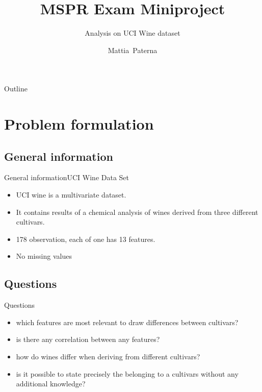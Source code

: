 \documentclass{beamer}
\title{MSPR Exam Miniproject}
\subtitle{Analysis on UCI Wine dataset}
\author{Mattia~Paterna}
\institute[Aalborg University, Copenhagen] %
{
  \inst{}%
  Sound and Music Computing\\
  Aalborg University, Copenhagen
}
\date{}
\begin{document}
\begin{frame}
  \titlepage
\end{frame}

\begin{frame}{Outline}
  \tableofcontents
\end{frame}

\section{Problem formulation}

\subsection{General information}

\begin{frame}{General information}{UCI Wine Data Set}
  \begin{itemize}
  \item {UCI wine is a multivariate dataset.
    
  }
  \item {
    It contains results of a chemical analysis of wines derived from three different cultivars.
  }
  \item {
    178 observation, each of one has 13 features.
  }
  \item {
    No missing values
  }
  \end{itemize}
\end{frame}


\subsection{Questions}

\begin{frame}{Questions}
  \begin{itemize}
  \item {
    which features are most relevant to draw differences between cultivars?
  }
  \item {   
    is there any correlation between any features?
  }
  \item {
    how do wines differ when deriving from different cultivars?
  }
  \item {
    is it possible to state precisely the belonging to a cultivars without any additional knowledge?
  }
  \end{itemize}
\end{frame}
\end{document}
